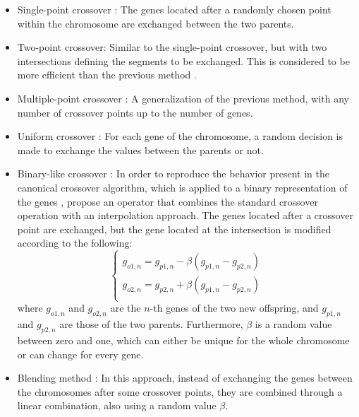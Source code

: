 \documentclass{ametsoc}
\begin{document}
\begin{itemize}
	\item Single-point crossover \citep{Goldberg1989}: The genes located after a randomly chosen point within the chromosome are exchanged between the two parents.
	
	\item Two-point crossover: Similar to the single-point crossover, but with two intersections defining the segments to be exchanged. This is considered to be more efficient than the previous method \citep{Beasley1993a}.
	
	\item Multiple-point crossover \citep{DeJong1975a}: A generalization of the previous method, with any number of crossover points up to the number of genes.
	
	\item Uniform crossover \citep{Syswerda1989}: For each gene of the chromosome, a random decision is made to exchange the values between the parents or not.
	
	\item Binary-like crossover \citep{Haupt2004}: In order to reproduce the behavior present in the canonical crossover algorithm, which is applied to a binary representation of the genes \citep{Goldberg1989, Goldberg1990a, Herrera1998a}, \citet{Haupt2004} propose an operator that combines the standard crossover operation with an interpolation approach. The genes located after a crossover point are exchanged, but the gene located at the intersection is modified according to the following:
	\begin{equation}
	\left\lbrace \begin{array}{l} 
	g_{o1,n} = g_{p1,n} - \beta (g_{p1,n} - g_{p2,n}) \\
	g_{o2,n} = g_{p2,n} + \beta (g_{p1,n} - g_{p2,n}) \\
	\end{array} \right.
	\label{eq:binary_like_crossover}
	\end{equation}
	where $g_{o1,n}$ and $g_{o2,n}$ are the $n$-th genes of the two new offspring, and $g_{p1,n}$ and $g_{p2,n}$ are those of the two parents. Furthermore, $\beta$ is a random value between zero and one, which can either be unique for the whole chromosome or can change for every gene.
	
	\item Blending method \citep{Radcliffe1991a}: In this approach, instead of exchanging the genes between the chromosomes after some crossover points, they are combined through a linear combination, also using a random value $\beta$.
	

\end{itemize}
\end{document}
